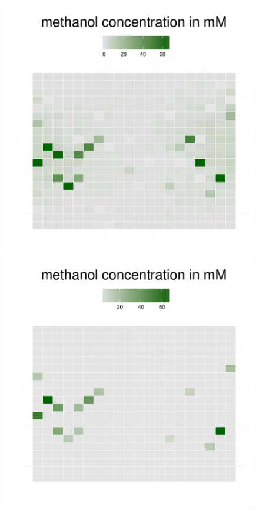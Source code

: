 \begin{figure}[h!]
{\begin{minipage}[t]{0.3\textwidth}
  \end{minipage}
  \begin{minipage}[t]{0.3\textwidth}
    \includegraphics[width=\textwidth]{../results/barkeri_20x20_seed9659_methanol100.pdf}
  \end{minipage}
  \begin{minipage}[t]{0.3\textwidth}
    \includegraphics[width=\textwidth]{../results/barkeri_20x20_seed9659_methanol130.pdf}

\end{minipage}}
\end{figure}
